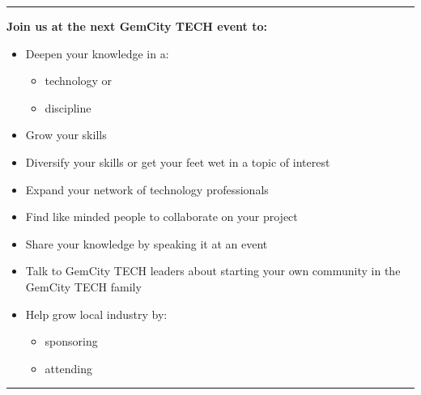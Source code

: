 \documentclass[14pt]{extarticle}
\author{}
\date{}
\providecommand{\tightlist}{%
  \setlength{\itemsep}{0pt}\setlength{\parskip}{0pt}}
\providecommand{\tightlist}{%
  \setlength{\itemsep}{0pt}\setlength{\parskip}{0pt}}
\begin{document}
\pagecolor{gemgreen}
\begin{multicols}{3}


\ifdefined\Shaded\renewenvironment{Shaded}{\begin{tcolorbox}[enhanced, breakable, frame hidden, sharp corners, interior hidden, boxrule=0pt, borderline west={3pt}{0pt}{shadecolor}]}{\end{tcolorbox}}\fi

\thispagestyle{empty}
\hrule

\textbf{Join us at the next GemCity TECH event to:}

\begin{itemize}
\tightlist
\item
  Deepen your knowledge in a:

  \begin{itemize}
  \tightlist
  \item
    technology or
  \item
    discipline
  \end{itemize}
\item
  Grow your skills
\item
  Diversify your skills or get your feet wet in a topic of interest
\item
  Expand your network of technology professionals
\item
  Find like minded people to collaborate on your project
\item
  Share your knowledge by speaking it at an event
\item
  Talk to GemCity TECH leaders about starting your own community in the
  GemCity TECH family
\item
  Help grow local industry by:

  \begin{itemize}
  \tightlist
  \item
    sponsoring
  \item
    attending
  \end{itemize}
\end{itemize}

\hfill

\hrule



\end{multicols}
\end{document}
